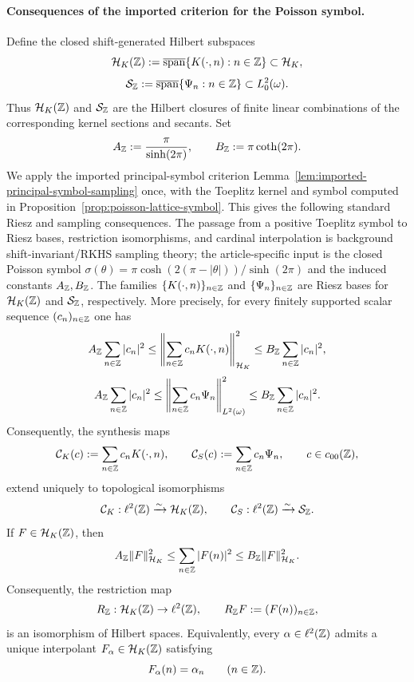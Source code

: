 \paragraph{Consequences of the imported criterion for the Poisson symbol.}
Define the closed shift-generated Hilbert subspaces
\[
\mathcal H_K(\mathbb{Z})
:=
\overline{\operatorname{span}}\{K(\cdot,n):n\in\mathbb{Z}\}
\subset \mathcal H_K,
\]
\[
\mathcal S_{\mathbb{Z}}
:=
\overline{\operatorname{span}}\{\Psi_n:n\in\mathbb{Z}\}
\subset L^2_0(\omega).
\]
Thus $\mathcal H_K(\mathbb{Z})$ and $\mathcal S_{\mathbb{Z}}$ are the Hilbert closures
of finite linear combinations of the corresponding kernel sections and
secants.
Set
\begin{equation}\label{eq:lattice-sampling-constants}
A_{\mathbb{Z}}:=\frac{\pi}{\sinh(2\pi)},
\qquad
B_{\mathbb{Z}}:=\pi\coth(2\pi).
\end{equation}
We apply the imported principal-symbol criterion
Lemma~\ref{lem:imported-principal-symbol-sampling} once, with the Toeplitz
kernel and symbol computed in
Proposition~\ref{prop:poisson-lattice-symbol}.  This gives the following
standard Riesz and sampling consequences.  The passage from a positive
Toeplitz symbol to Riesz bases, restriction isomorphisms, and cardinal
interpolation is background shift-invariant/RKHS sampling theory; the
article-specific input is the closed Poisson symbol
$\sigma(\theta)=\pi\cosh(2(\pi-|\theta|))/\sinh(2\pi)$ and the induced
constants $A_{\mathbb{Z}},B_{\mathbb{Z}}$.  The families
$\{K(\cdot,n)\}_{n\in\mathbb{Z}}$ and $\{\Psi_n\}_{n\in\mathbb{Z}}$ are Riesz bases for
$\mathcal H_K(\mathbb{Z})$ and $\mathcal S_{\mathbb{Z}}$, respectively.  More
precisely, for every
finitely supported scalar sequence $(c_n)_{n\in\mathbb{Z}}$ one has
\begin{equation}\label{eq:lattice-riesz-kernel}
A_{\mathbb{Z}}\sum_{n\in\mathbb{Z}}|c_n|^2
\le
\left\|
\sum_{n\in\mathbb{Z}}c_nK(\cdot,n)
\right\|_{\mathcal H_K}^2
\le
B_{\mathbb{Z}}\sum_{n\in\mathbb{Z}}|c_n|^2,
\end{equation}
\begin{equation}\label{eq:lattice-riesz-secant}
A_{\mathbb{Z}}\sum_{n\in\mathbb{Z}}|c_n|^2
\le
\left\|
\sum_{n\in\mathbb{Z}}c_n\Psi_n
\right\|_{L^2(\omega)}^2
\le
B_{\mathbb{Z}}\sum_{n\in\mathbb{Z}}|c_n|^2.
\end{equation}
Consequently, the synthesis maps
\[
\mathcal C_K(c):=\sum_{n\in\mathbb{Z}}c_nK(\cdot,n),
\qquad
\mathcal C_S(c):=\sum_{n\in\mathbb{Z}}c_n\Psi_n,
\qquad c\in c_{00}(\mathbb{Z}),
\]
extend uniquely to topological isomorphisms
\[
\mathcal C_K:\ell^2(\mathbb{Z})\xrightarrow{\sim}\mathcal H_K(\mathbb{Z}),
\qquad
\mathcal C_S:\ell^2(\mathbb{Z})\xrightarrow{\sim}\mathcal S_{\mathbb{Z}}.
\]
If $F\in\mathcal H_K(\mathbb{Z})$, then
\begin{equation}\label{eq:lattice-sampling-HK}
A_{\mathbb{Z}}\|F\|_{\mathcal H_K}^2
\le
\sum_{n\in\mathbb{Z}}|F(n)|^2
\le
B_{\mathbb{Z}}\|F\|_{\mathcal H_K}^2.
\end{equation}
Consequently, the restriction map
\[
R_{\mathbb{Z}}:\mathcal H_K(\mathbb{Z})\to \ell^2(\mathbb{Z}),
\qquad
R_{\mathbb{Z}}F:=(F(n))_{n\in\mathbb{Z}},
\]
is an isomorphism of Hilbert spaces.  Equivalently, every
$\alpha\in\ell^2(\mathbb{Z})$ admits a unique interpolant
$F_\alpha\in\mathcal H_K(\mathbb{Z})$ satisfying
\[
F_\alpha(n)=\alpha_n
\qquad(n\in\mathbb{Z}).
\]

